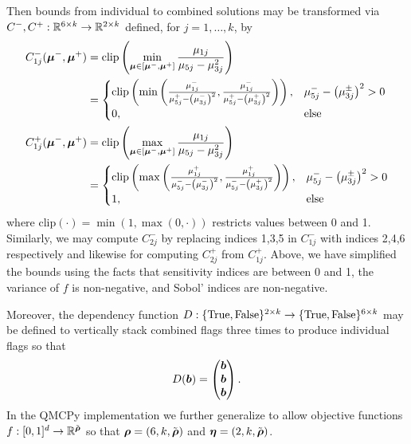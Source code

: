 \documentclass{article}[12pt]
\begin{document}
Then bounds from individual to combined solutions may be transformed via $C^-,C^+:\mathbb{R}^{6 \times k} \to \mathbb{R}^{2 \times k}$ defined, for $j=1,\dots,k$, by  
\begin{align*}
    C_{1j}^-(\boldsymbol{\mu}^-,\boldsymbol{\mu}^+) 
    &= \text{clip}\left(\min_{\boldsymbol{\mu} \in [\boldsymbol{\mu}^-,\boldsymbol{\mu}^+]} \frac{\mu_{1j}}{\mu_{5j}-\mu_{3j}^2}\right) \\
    &= \begin{cases} 
        \text{clip}\left(\min\left(\frac{\mu_{1j}^-}{\mu_{5j}^+-\left(\mu_{3j}^-\right)^2},\frac{\mu_{1j}^-}{\mu_{5j}^+-\left(\mu_{3j}^+\right)^2}\right)\right), & \mu_{5j}^- - \left(\mu_{3j}^\pm\right)^2 >0 \\
        0, &\text{else}
    \end{cases} \\
    C_{1j}^+(\boldsymbol{\mu}^-,\boldsymbol{\mu}^+) 
    &= \text{clip}\left(\max_{\boldsymbol{\mu} \in [\boldsymbol{\mu}^-,\boldsymbol{\mu}^+]} \frac{\mu_{1j}}{\mu_{5j}-\mu_{3j}^2}\right) \\
    &= \begin{cases} 
        \text{clip}\left(\max\left(\frac{\mu_{1j}^+}{\mu_{5j}^--\left(\mu_{3j}^-\right)^2},\frac{\mu_{1j}^+}{\mu_{5j}^--\left(\mu_{3j}^+\right)^2}\right)\right), & \mu_{5j}^- - \left(\mu_{3j}^\pm\right)^2 >0 \\
        1, &\text{else}
    \end{cases}
\end{align*}
where $\text{clip}(\cdot) = \min(1,\max(0,\cdot))$ restricts values between 0 and 1. Similarly, we may compute $C_{2j}^-$ by replacing indices 1,3,5 in $C_{1j}^-$ with indices 2,4,6 respectively and likewise for computing $C_{2j}^+$ from $C_{1j}^+$. Above, we have simplified the bounds using the facts that sensitivity indices are between 0 and 1, the variance of $f$ is non-negative, and Sobol' indices are non-negative. 

Moreover, the dependency function $D:\{\text{True},\text{False}\}^{2 \times k} \to \{\text{True},\text{False}\}^{6 \times k}$ may be defined to vertically stack combined flags three times to produce individual flags so that 
\begin{equation*}
    D(\boldsymbol{b}) = \begin{pmatrix} \boldsymbol{b} \\ \boldsymbol{b} \\ \boldsymbol{b} \end{pmatrix}.
\end{equation*}
In the QMCPy implementation we further generalize to allow objective functions $f:[0,1]^d \to \mathbb{R}^{\tilde{\boldsymbol{\rho}}}$ so that $\boldsymbol{\rho} = (6,k,\tilde{\boldsymbol{\rho}})$ and $\boldsymbol{\eta} = (2,k,\tilde{\boldsymbol{\rho}})$.
\end{document}
